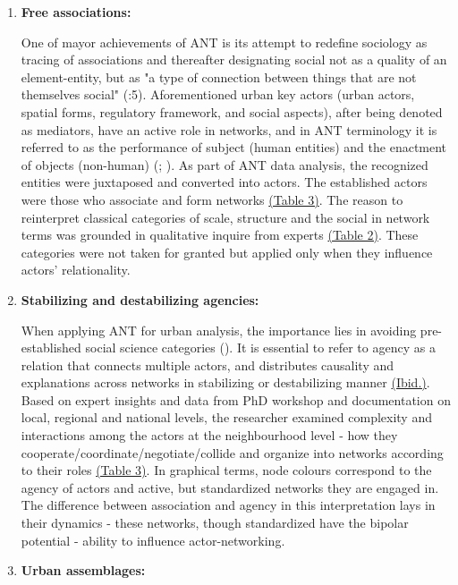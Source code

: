 \documentclass[11pt]{report}
\begin{document}
\begin{enumerate}
\item \textbf{Free associations:}

One of mayor achievements of ANT is its attempt to redefine sociology as tracing of associations and thereafter designating social not as a quality of an element-entity, but as "a type of connection between things that are not themselves social" (\cite{Latour 2005}:5).
Aforementioned urban key actors (urban actors, spatial forms, regulatory framework, and social aspects), after being denoted as mediators, have an active role in networks, and in ANT terminology it is referred to as the performance of subject (human entities) and the enactment of objects (non-human) (\cite{Farias 2011}; \cite{Callon 1986}). As part of ANT data analysis, the recognized entities were juxtaposed and converted into actors. The established actors were those who associate and form networks \href{}{(Table 3)}. The reason to reinterpret classical categories of scale, structure and the social in network terms was grounded in qualitative inquire from experts \href{}{(Table 2)}. These categories were not taken for granted but applied only when they influence actors’ relationality.

\item \textbf{Stabilizing and destabilizing agencies:}

When applying ANT for urban analysis, the importance lies in avoiding pre-established social science categories (\cite{Farias 2011}). It is essential to refer to agency as a relation that connects multiple actors, and distributes causality and explanations across networks in stabilizing or destabilizing manner \href{}{(Ibid.)}. 
Based on expert insights and data from PhD workshop and documentation on local, regional and national levels, the researcher examined complexity and interactions among the actors at the neighbourhood level - how they cooperate/coordinate/negotiate/collide and organize into networks according to their roles \href{}{(Table 3)}. In graphical terms, node colours correspond to the agency of actors and active, but standardized networks they are engaged in. The difference between association and agency in this interpretation lays in their dynamics - these networks, though standardized have the bipolar potential - ability to influence actor-networking.

\item \textbf{Urban assemblages:}


\end{enumerate}
\end{document}
